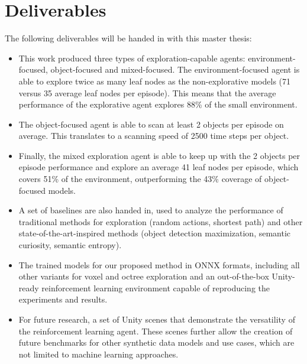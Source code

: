 \section{Deliverables}
The following deliverables will be handed in with this master thesis:
\begin{itemize}
    \item This work produced three types of exploration-capable agents: environment-focused, object-focused and mixed-focused.
    The environment-focused agent is able to explore twice as many leaf nodes as the non-explorative models (71 versus 35 average leaf nodes per episode). This means that the average performance of the explorative agent explores 88\% of the small environment. 
    
    \item  The object-focused agent is able to scan at least 2 objects per episode on average. This translates to a scanning speed of 2500 time steps per object.
    
    \item Finally, the mixed exploration agent is able to keep up with the 2 objects per episode performance and explore an average 41 leaf nodes per episode, which covers 51\% of the environment, outperforming the 43\% coverage of object-focused models.
   
   \item A set of baselines are also handed in, used to analyze the performance of traditional methods for exploration (random actions, shortest path) and other state-of-the-art-inspired methods (object detection maximization, semantic curiosity, semantic entropy).
   
    \item The trained models for our proposed method in ONNX formats, including all other variants for voxel and octree exploration and an out-of-the-box Unity-ready reinforcement learning environment capable of reproducing the experiments and results.

    \item For future research, a set of Unity scenes that demonstrate the versatility of the reinforcement learning agent. These scenes further allow the creation of future benchmarks for other synthetic data models and use cases, which are not limited to machine learning approaches.
\end{itemize}
